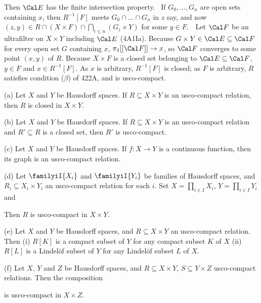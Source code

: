 {

\noindent Then $\Cal E$ has the finite intersection property.   \Prf\ If
$G_0,\ldots,G_n$ are open sets containing $x$, then $R^{-1}[F]$ meets
$G_0\cap\ldots\cap G_n$ in $z$ say, and now
$(z,y)\in R\cap(X\times F)\cap\bigcap_{i\le n}(G_i\times Y)$ for some
$y\in F$.\ \QeD\   Let
$\Cal F$ be an ultrafilter on $X\times Y$ including $\Cal E$
(4A1Ia).   Because $G\times Y\in\Cal E\subseteq\Cal F$ for every
open set $G$ containing $x$, $\pi_1[[\Cal F]]\to x$, so $\Cal F$
converges to some point
$(x,y)$ of $R$.   Because $X\times F$ is a
closed set belonging to $\Cal E\subseteq\Cal F$, $y\in F$ and
$x\in R^{-1}[F]$.   As $x$ is arbitrary, $R^{-1}[F]$ is closed;  as $F$
is arbitrary, $R$ satisfies condition ($\beta$) of 422A, and is
usco-compact.
}%

 (a) Let $X$ and $Y$ be Hausdorff spaces.
If $R\subseteq X\times Y$ is an usco-compact relation, then $R$ is
closed in $X\times Y$.

(b) Let $X$ and $Y$ be Hausdorff spaces.
If $R\subseteq X\times Y$ is an usco-compact relation and
$R'\subseteq R$ is a closed set, then $R'$ is usco-compact.

(c) Let $X$ and $Y$ be Hausdorff spaces.   If $f:X\to Y$ is a continuous
function, then its graph is an usco-compact relation.

(d) Let $\familyiI{X_i}$ and $\familyiI{Y_i}$ be families of Hausdorff
spaces, and $R_i\subseteq X_i\times Y_i$ an usco-compact relation for
each $i$.   Set $X=\prod_{i\in I}X_i$, $Y=\prod_{i\in I}Y_i$ and


\noindent Then $R$ is usco-compact in $X\times Y$.

(e) Let $X$ and $Y$ be Hausdorff spaces, and $R\subseteq X\times Y$ an
usco-compact relation.   Then (i) $R[K]$ is a compact subset of $Y$ for
any compact subset $K$ of $X$ (ii) $R[L]$ is a Lindel\"of subset of $Y$
for any Lindel\"of subset $L$ of $X$.

(f) Let $X$, $Y$ and $Z$ be Hausdorff spaces, and
$R\subseteq X\times Y$, $S\subseteq Y\times Z$ usco-compact relations.
Then the composition


\noindent is usco-compact in $X\times Z$.

